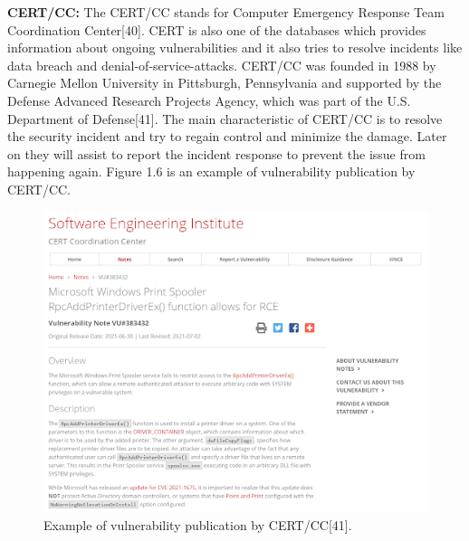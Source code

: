 {\bf CERT/CC:} The CERT/CC stands for Computer Emergency Response Team Coordination Center[40]. CERT is also one of the databases which provides information about ongoing vulnerabilities and it also tries to resolve incidents like data breach and denial-of-service-attacks. CERT/CC was founded in 1988 by Carnegie Mellon University in Pittsburgh, Pennsylvania and supported by the Defense Advanced Research Projects Agency, which was part of the U.S. Department of Defense[41]. The main characteristic of CERT/CC is to resolve the security incident and try to regain control and minimize the damage. Later on they will assist to report the incident response to prevent the issue from happening again. Figure 1.6 is an example of vulnerability publication by CERT/CC.
\newpage
\begin{figure}[h!]
	\includegraphics[width=15cm]{includes/cert-cc.png}
	\centering
	\caption{Example of vulnerability publication by CERT/CC[41].}
	\label{fig:cert}
\end{figure}


